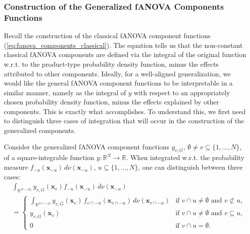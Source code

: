 \subsubsection{Construction of the Generalized fANOVA Components Functions}
Recall the construction of the classical fANOVA component functions (\autoref{eq:fanova_components_classical}). The equation tells us that the non-constant classical fANOVA components are defined via the integral of the original function w.r.t. to the product-type probability density function, minus the effects attributed to other components.
Ideally, for a well-aligned generalization, we would like the general fANOVA component functions 
to be interpretable in a similar manner, namely as the integral of $y$ with respect to an 
appropriately chosen probability density function, minus the effects explained by other components. This is exactly what \cite{rahman2014} accomplishes.
To understand this, we first need to distinguish three cases of integration that will occur in the construction of the generalized components.
\begin{proposition}\label{prop:generalized_fanova_integration_cases}
Consider the generalized fANOVA component functions $y_{v,G}$, $\emptyset \ne v \subseteq \{1,\dots,N\}$, of a square-integrable function $y : \mathbb{R}^N \to \mathbb{R}$. When integrated w.r.t. the probability measure $f_{-u}(\boldsymbol{x}_{-u})\, d \nu(\boldsymbol{x}_{-u})$, $u \subseteq \{1,\dots,N\}$, one can distinguish between three cases:
\begin{equation}
\begin{aligned}
& \int_{\mathbb{R}^{N - |u|}} y_{v,G}(\boldsymbol{x}_v) 
    f_{-u}(\boldsymbol{x}_{-u}) \, d \nu(\boldsymbol{x}_{-u}) \\[0.5em]
&= 
\begin{cases}
    \displaystyle 
    \int_{\mathbb{R}^{|v \cap -u|}} 
        y_{v,G}(\boldsymbol{x}_v)\,
        f_{v \cap -u}(\boldsymbol{x}_{v \cap -u})\,
        d \nu(\boldsymbol{x}_{v \cap -u}) 
        & \text{if } v \cap u \ne \emptyset \text{ and } v \not\subset u, \\[1ex]
    y_{v,G}(\boldsymbol{x}_v) 
        & \text{if } v \cap u \ne \emptyset \text{ and } v \subseteq u, \\[1ex]
    0 
        & \text{if } v \cap u = \emptyset.
\end{cases}
\end{aligned}
\end{equation}
\end{proposition}
